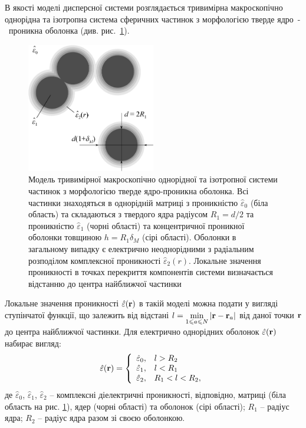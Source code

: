 \documentclass[14pt,twoside]{vakthesis}
\begin{document}
В якості моделі дисперсної системи розглядається тривимірна макроскопічно однорідна та ізотропна система сферичних частинок з морфологією тверде ядро~-~проникна оболонка (див. рис.~\ref{fig:model-Mlayers}). 
\begin{figure}[!b]
	\vspace{20pt}
	\centering
	\includegraphics[width=0.5\textwidth]{Fig1_Microstructure_new5.eps}
	\caption{\label{fig:model-Mlayers}
		Модель тривимірної макроскопічно однорідної та ізотропної системи частинок з морфологією тверде ядро-проникна оболонка. Всі частинки знаходяться в однорідній матриці з проникністю $\hat{\varepsilon}_0$ (біла область) та складаються з твердого ядра радіусом $R_1=d/2$ та проникністю $\hat{\varepsilon}_1$ (чорні області) та концентричної проникної оболонки товщиною $h=R_1\delta_M$ (сірі області). Оболонки в загальному випадку є електрично неоднорідними з радіальним розподілом комплексної проникності $\hat{\varepsilon}_2(r)$. Локальне значення проникності в точках перекриття компонентів системи визначається відстанню до центра найближчої частинки}
\end{figure} 
Локальне значення проникності $\hat{\varepsilon} ({\bf r})$ в такій моделі можна подати у вигляді ступінчатої функції, що залежить від відстані $l = \min\limits_{1 \leq a \leq N} |{\bf r} - {\bf r}_a|$ від даної точки ${\bf r}$ до центра найближчої частинки. Для електрично однорідних оболонок $\hat{\varepsilon} ({\bf r})$ набирає вигляд:
\begin{equation}\label{eq:local-perm-1layer}
\hat{\varepsilon} ({\bf r}) = \left\{ 
\begin{array}{ll}
\hat{\varepsilon}_0, & l > R_2\\
\hat{\varepsilon}_1, & l < R_1\\
\hat{\varepsilon}_2, & R_1 < l < R_2,
\end{array}
\right.
\end{equation}
де $\hat{\varepsilon}_0$, $\hat{\varepsilon}_1$, $\hat{\varepsilon}_2$ -- комплексні діелектричні проникності, відповідно, матриці (біла область на рис. \ref{fig:model-Mlayers}), ядер (чорні області) та оболонок (сірі області); $R_1$ -- радіус ядра; $R_2$ -- радіус ядра разом зі своєю оболонкою. 
\end{document}
